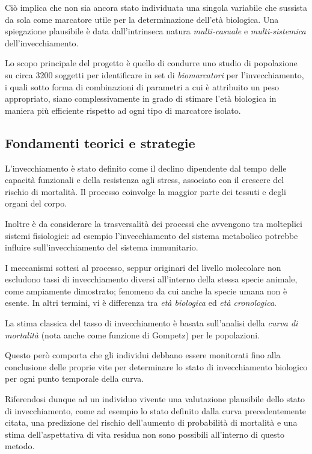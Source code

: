 \documentclass[12pt,openright,twoside,a4paper]{book}
\begin{document}
Ciò implica che non sia ancora stato individuata una singola variabile che sussista da sola come marcatore utile per la determinazione dell'età biologica. Una spiegazione plausibile è data dall'intrinseca  natura \textit{multi-casuale} e \textit{multi-sistemica} dell'invecchiamento.



Lo scopo principale del progetto è quello di condurre uno studio di popolazione su circa 3200 soggetti per identificare in set di \textit{biomarcatori} per l'invecchiamento, i quali sotto forma di combinazioni di parametri a cui è attribuito un peso appropriato, siano complessivamente in grado di stimare l'età biologica in maniera più efficiente rispetto ad ogni tipo di marcatore isolato.

\subsection{Fondamenti teorici e strategie}
L'invecchiamento è stato definito come il declino dipendente dal tempo delle capacità funzionali e della resistenza agli stress, associato con il crescere del rischio di mortalità.
Il processo coinvolge la maggior parte dei tessuti e degli organi del corpo.

Inoltre è da considerare la trasversalità dei processi che avvengono tra molteplici sistemi fisiologici: ad esempio l'invecchiamento del sistema metabolico potrebbe influire sull'invecchiamento del sistema immunitario.

I meccanismi sottesi al processo, seppur originari del livello molecolare non escludono tassi di invecchiamento diversi all'interno della stessa specie animale, come ampiamente dimostrato; fenomeno da cui anche la specie umana non è esente. In altri termini, vi è differenza tra \textit{età biologica} ed \textit{età cronologica}.

La stima classica del tasso di invecchiamento è basata sull'analisi della \textit{curva di mortalità} (nota anche come funzione di Gompetz) per le popolazioni.

Questo però comporta che gli individui debbano essere monitorati fino alla conclusione delle proprie vite per determinare lo stato di invecchiamento biologico per ogni punto temporale della curva.

Riferendosi dunque ad un individuo vivente una valutazione plausibile dello stato di invecchiamento, come ad esempio lo stato definito dalla curva precedentemente citata, una predizione del rischio dell'aumento di probabilità di mortalità e una stima dell'aspettativa di vita residua non sono possibili all'interno di questo metodo.
\end{document}
